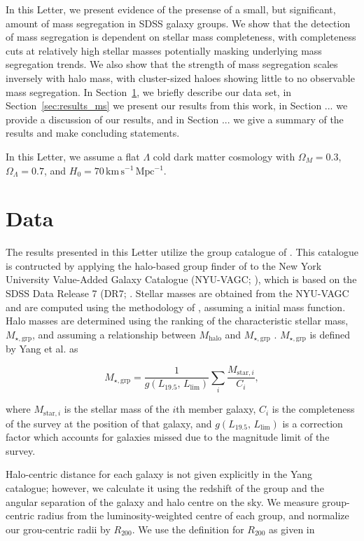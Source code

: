 In this Letter, we present evidence of the presense of a small, but
significant, amount of mass segregation in SDSS galaxy groups.  We
show that the detection of mass segregation is dependent on stellar
mass completeness, with completeness cuts at relatively high stellar
masses potentially masking underlying mass segregation trends.  We
also show that the strength of mass segregation scales inversely with
halo mass, with cluster-sized haloes showing little to no observable
mass segregation.  In Section~\ref{sec:data_ms}, we briefly describe
our data set, 
in Section~\ref{sec:results_ms} we present our results from this work,
in Section
... we provide a discussion of our results, and in Section ... we give
a summary of the results and make concluding statements.
\par
In this Letter, we assume a flat $\Lambda$ cold dark matter cosmology
with $\Omega_M = 0.3$, $\Omega_\Lambda = 0.7$, and $H_0 =
70\,\mathrm{km}\,\mathrm{s^{-1}}\,\mathrm{Mpc^{-1}}$.

\section{Data}
\label{sec:data_ms}

The results presented in this Letter utilize the group catalogue of
\cite{yang2007}.  This catalogue is contructed by applying the
halo-based group finder of \citet{yang2005, yang2007} to the New York
University Value-Added Galaxy Catalogue (NYU-VAGC;
\citealt{blanton2005a}), which is based on the SDSS Data Release 7
(DR7; \citealt{abazajian2009}.  Stellar masses are obtained from the
NYU-VAGC and are computed using the methodology of
\citet{blanton2007}, assuming a \citet{chabrier2003} initial mass
function.  Halo masses are determined using the ranking of the
characteristic stellar mass, $M_{\star,\mathrm{grp}}$, and assuming a
relationship between $M_\mathrm{halo}$ and $M_{\star,\mathrm{grp}}$
\citep{yang2007}.  $M_{\star,\mathrm{grp}}$ is defined by Yang et
al. as

\begin{equation}
  M_{\star,\mathrm{grp}} = \frac{1}{g(L_{19.5},\,L_\mathrm{lim})}
  \sum_i \frac{M_{\mathrm{star},i}}{C_i},
\end{equation}

\noindent
where $M_{\mathrm{star},i}$ is the stellar mass of the $i$th member
galaxy, $C_i$ is the completeness of the survey at the position of
that galaxy, and $g(L_{19.5},\,L_\mathrm{lim})$ is a correction factor
which accounts for galaxies missed due to the magnitude limit of the
survey.
\par
Halo-centric distance for each galaxy is not given explicitly in the
Yang catalogue; however, we calculate it using the redshift of the
group and the angular separation of the galaxy and halo centre on the
sky.  We measure group-centric radius from the luminosity-weighted
centre of each group, and normalize our grou-centric radii by
$R_{200}$.  We use the definition for $R_{200}$ as given in
\citet{carlberg1997}

